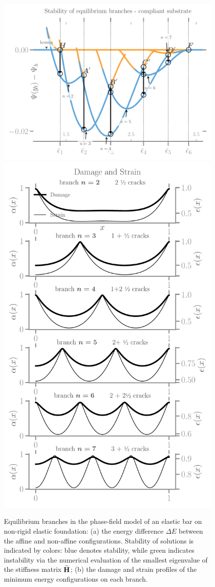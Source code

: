 \begin{figure}
\includegraphics[width=.8\textwidth]{../images/model_compliant_energy.pdf}
\includegraphics[width=.7\textwidth]{../images/model_compliant_fields.pdf}
\caption{
Equilibrium branches in the phase-field model of an elastic bar on non-rigid elastic foundation: (a) the energy difference $\Delta E$ between the affine and non-affine configurations. Stability of solutions is indicated by colors: blue denotes stability, while green indicates instability   via the numerical evaluation of the smallest eigenvalue of the stiffness matrix $\widetilde{\mathbf{H}}$; (b) the damage and strain profiles of the minimum energy configurations on each branch.}
    \label{fig:branches-compliant}
\end{figure}

